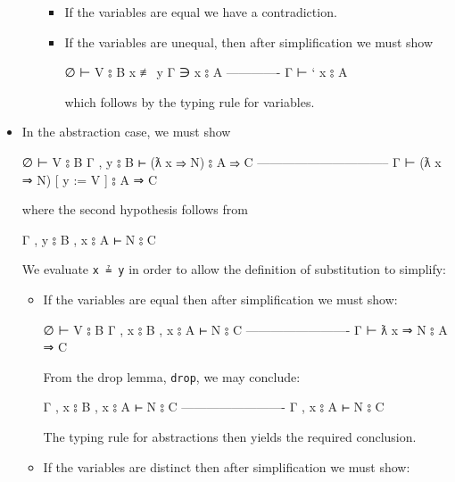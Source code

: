\begin{itemize}
\begin{itemize}
    \begin{itemize}
    \item
      If the variables are equal we have a contradiction.
    \item
      If the variables are unequal, then after simplification we must
      show

      \begin{myDisplay}
      ∅ ⊢ V ⦂ B
      x ≢ y
      Γ ∋ x ⦂ A
      -------------
      Γ ⊢ ` x ⦂ A
      \end{myDisplay}

      which follows by the typing rule for variables.
    \end{itemize}
  \end{itemize}
\item
  In the abstraction case, we must show

  \begin{myDisplay}
  ∅ ⊢ V ⦂ B
  Γ , y ⦂ B ⊢ (ƛ x ⇒ N) ⦂ A ⇒ C
  --------------------------------
  Γ ⊢ (ƛ x ⇒ N) [ y := V ] ⦂ A ⇒ C
  \end{myDisplay}

  where the second hypothesis follows from

  \begin{myDisplay}
  Γ , y ⦂ B , x ⦂ A ⊢ N ⦂ C
  \end{myDisplay}

  We evaluate \texttt{x\ ≟\ y} in order to allow the definition of
  substitution to simplify:

  \begin{itemize}
  \item
    If the variables are equal then after simplification we must show:

    \begin{myDisplay}
    ∅ ⊢ V ⦂ B
    Γ , x ⦂ B , x ⦂ A ⊢ N ⦂ C
    -------------------------
    Γ ⊢ ƛ x ⇒ N ⦂ A ⇒ C
    \end{myDisplay}

    From the drop lemma, \texttt{drop}, we may conclude:

    \begin{myDisplay}
    Γ , x ⦂ B , x ⦂ A ⊢ N ⦂ C
    -------------------------
    Γ , x ⦂ A ⊢ N ⦂ C
    \end{myDisplay}

    The typing rule for abstractions then yields the required
    conclusion.
  \item
    If the variables are distinct then after simplification we must
    show:


\end{itemize}
\end{itemize}
